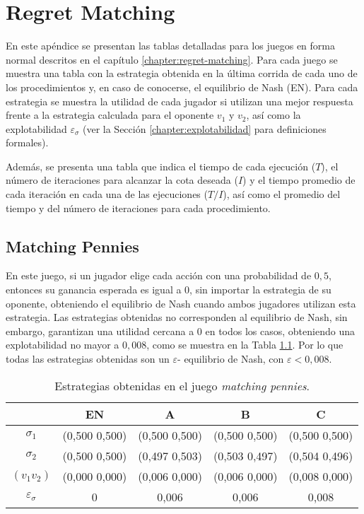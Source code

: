 \chapter{Regret Matching}
\label{apex:chapter:experimentos-rm}

En este apéndice se presentan las tablas detalladas para los juegos en forma normal descritos en el capítulo \ref{chapter:regret-matching}. Para cada juego se muestra una tabla con la estrategia obtenida en la última corrida de cada uno de los procedimientos y, en caso de conocerse, el equilibrio de Nash (EN). Para cada estrategia se muestra la utilidad de cada jugador si utilizan una mejor respuesta frente a la estrategia calculada para el oponente $v_1$ y $v_2$, así como la explotabilidad $\varepsilon_{\sigma}$ (ver la Sección \ref{chapter:explotabilidad} para definiciones formales).

Además, se presenta una tabla que indica el tiempo de cada ejecución ($T$), el número de iteraciones para alcanzar la cota deseada ($I$) y el tiempo promedio de cada iteración en cada una de las ejecuciones ($T/I$), así como el promedio del tiempo y del número de iteraciones para cada procedimiento.


\section*{Matching Pennies}

En este juego, si un jugador elige cada acción con una probabilidad de $0,5$, entonces su ganancia esperada es igual a $0$, sin importar la estrategia de su oponente, obteniendo el equilibrio de Nash cuando ambos jugadores utilizan esta estrategia. Las estrategias obtenidas no corresponden al equilibrio de Nash, sin embargo, garantizan una utilidad cercana a $0$ en todos los casos, obteniendo una explotabilidad no mayor a $0,008$, como se muestra en la Tabla \ref{tab:estrategias-matching-pennies}. Por lo que todas las estrategias obtenidas son un $\varepsilon$- equilibrio de Nash, con $\varepsilon < 0,008$.

\begin{table}[h]
    \centering
    \caption{Estrategias obtenidas en el juego \textit{matching pennies}.}
    \label{tab:estrategias-matching-pennies}
    \begin{tabular}{c c c c c}
    \toprule
        & EN & A & B & C \\ \midrule
        $\sigma_1$   & (0,500 0,500) & (0,500 0,500) & (0,500 0,500) & (0,500 0,500) \\
        $\sigma_2$   & (0,500 0,500) & (0,497 0,503) & (0,503 0,497) & (0,504 0,496) \\ 
        $(v_1  v_2)$ & (0,000 0,000) & (0,006 0,000) & (0,006 0,000) & (0,008 0,000) \\
        $\varepsilon_{\sigma}$ & 0 & 0,006 & 0,006 & 0,008 \\ \bottomrule
    \end{tabular}
\end{table}

